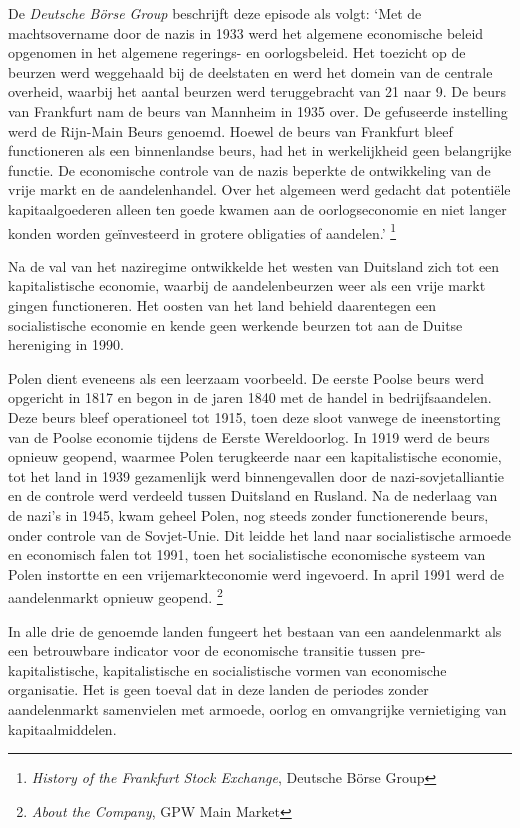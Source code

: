 \documentclass[
  a5paper,
  smalldemyvopaper,11pt,twoside,onecolumn,openright,extrafontsizes,
hidelinks]{memoir}
\begin{document}
De \emph{Deutsche Börse Group} beschrijft deze episode als volgt: `Met
de machtsovername door de nazis in 1933 werd het algemene economische
beleid opgenomen in het algemene regerings- en oorlogsbeleid. Het
toezicht op de beurzen werd weggehaald bij de deelstaten en werd het
domein van de centrale overheid, waarbij het aantal beurzen werd
teruggebracht van 21 naar 9. De beurs van Frankfurt nam de beurs van
Mannheim in 1935 over. De gefuseerde instelling werd de Rijn-Main Beurs
genoemd. Hoewel de beurs van Frankfurt bleef functioneren als een
binnenlandse beurs, had het in werkelijkheid geen belangrijke functie.
De economische controle van de nazis beperkte de ontwikkeling van de
vrije markt en de aandelenhandel. Over het algemeen werd gedacht dat
potentiële kapitaalgoederen alleen ten goede kwamen aan de
oorlogseconomie en niet langer konden worden geïnvesteerd in grotere
obligaties of aandelen.' \footnote{\emph{History of the Frankfurt Stock
  Exchange}, Deutsche Börse Group}

Na de val van het naziregime ontwikkelde het westen van Duitsland zich
tot een kapitalistische economie, waarbij de aandelenbeurzen weer als
een vrije markt gingen functioneren. Het oosten van het land behield
daarentegen een socialistische economie en kende geen werkende beurzen
tot aan de Duitse hereniging in 1990.

Polen dient eveneens als een leerzaam voorbeeld. De eerste Poolse beurs
werd opgericht in 1817 en begon in de jaren 1840 met de handel in
bedrijfsaandelen. Deze beurs bleef operationeel tot 1915, toen deze
sloot vanwege de ineenstorting van de Poolse economie tijdens de Eerste
Wereldoorlog. In 1919 werd de beurs opnieuw geopend, waarmee Polen
terugkeerde naar een kapitalistische economie, tot het land in 1939
gezamenlijk werd binnengevallen door de nazi-sovjetalliantie en de
controle werd verdeeld tussen Duitsland en Rusland. Na de nederlaag van
de nazi's in 1945, kwam geheel Polen, nog steeds zonder functionerende
beurs, onder controle van de Sovjet-Unie. Dit leidde het land naar
socialistische armoede en economisch falen tot 1991, toen het
socialistische economische systeem van Polen instortte en een
vrijemarkteconomie werd ingevoerd. In april 1991 werd de aandelenmarkt
opnieuw geopend. \footnote{\emph{About the Company}, GPW Main Market}

In alle drie de genoemde landen fungeert het bestaan van een
aandelenmarkt als een betrouwbare indicator voor de economische
transitie tussen pre-kapitalistische, kapitalistische en socialistische
vormen van economische organisatie. Het is geen toeval dat in deze
landen de periodes zonder aandelenmarkt samenvielen met armoede, oorlog
en omvangrijke vernietiging van kapitaalmiddelen.
\end{document}
